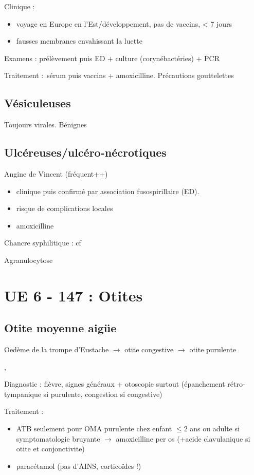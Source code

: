 \documentclass{article}
\begin{document}
Clinique : 
\begin{itemize}
  \item voyage en Europe en l'Est/développement, pas de vaccins, < 7 jours
  \item fausses membranes envahissant la luette
\end{itemize}

Examens : prélèvement puis ED + culture (corynébactéries) + PCR

Traitement : sérum puis vaccins + amoxicilline. Précautions gouttelettes

\subsection{Vésiculeuses}%
Toujours virales. Bénignes


\subsection{Ulcéreuses/ulcéro-nécrotiques}
Angine de Vincent (fréquent++) 
\begin{itemize}
  \item clinique puis confirmé par association fusospirillaire (ED).
  \item risque de complications locales
  \item amoxicilline
\end{itemize}

Chancre syphilitique : cf~

Agranulocytose

\section{UE 6 - 147 : Otites}%
\label{sec:otites}
\subsection{Otite moyenne aigüe}%
\label{sub:otite_moyenn_aigue}
Oedème de la trompe d'Eustache $\to$ otite congestive $\to$ otite purulente

, 

Diagnostic : fièvre, signes généraux + otoscopie surtout (épanchement
rétro-tympanique si purulente, congestion si congestive)

Traitement : 
\begin{itemize}
  \item ATB seulement pour OMA purulente chez enfant $\le 2$ ans ou adulte si
symptomatologie bruyante
$\rightarrow$ amoxicilline per os (+acide clavulanique si otite et conjonctivite)
\item paracétamol (pas d'AINS, corticoïdes !)
\end{itemize}
\end{document}
